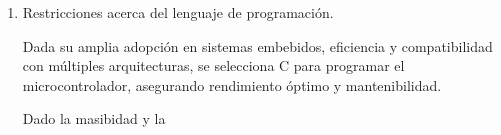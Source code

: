 \documentclass[
11pt, %
codirector, %
]{charter}
\begin{document}
\begin{enumerate}
\item Restricciones acerca del lenguaje de programación.

Dada su amplia adopción en sistemas embebidos, eficiencia y compatibilidad con múltiples arquitecturas, se selecciona C para programar el microcontrolador, asegurando rendimiento óptimo y mantenibilidad.

Dado la masibidad y la 

\end{enumerate}
\end{document}
